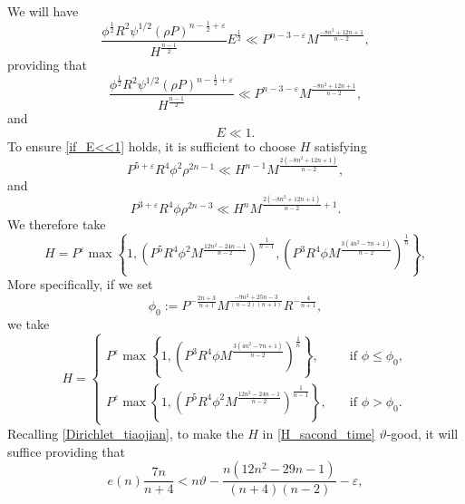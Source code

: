 \documentclass[12pt]{amsart}
\theoremstyle{definition}
\numberwithin{equation}{section}
\begin{document}
We will have
\begin{equation*}
    \frac{\phi^{\frac{1}{2}}R^2\psi^{1/2}(\rho P)^{n-\frac{1}{2}+\varepsilon}}{H^{\frac{n-1}{2}}}E^{\frac{1}{2}} \ll P^{n-3-\varepsilon}M^{\frac{-8n^2+12n+1}{n-2}},
\end{equation*}
providing that
\begin{equation}
    \label{if_E<<1}
    \frac{\phi^{\frac{1}{2}}R^2\psi^{1/2}(\rho P)^{n-\frac{1}{2}+\varepsilon}}{H^{\frac{n-1}{2}}} \ll P^{n-3-\varepsilon}M^{\frac{-8n^2+12n+1}{n-2}},
\end{equation}
and
\begin{equation}
    E \ll 1.
\end{equation}
To ensure \eqref{if_E<<1} holds, it is sufficient to choose $H$
satisfying
\begin{equation*}
    P^{5+\varepsilon}R^4\phi^2\rho^{2n-1} \ll H^{n-1}M^{\frac{2(-8n^2+12n+1)}{n-2}},
\end{equation*}
and
\begin{equation*}
    P^{3+\varepsilon}R^4\phi\rho^{2n-3} \ll H^{n}M^{\frac{2(-8n^2+12n+1)}{n-2}+1}.
\end{equation*}
We therefore take
\begin{equation*}
    H=P^{\varepsilon}\max\left\{ 1, (P^5R^4\phi^2M^{\frac{12n^2-24n-1}{n-2}})^{\frac{1}{n-1}}, (P^3R^4\phi M^{\frac{3(4n^2-7n+1)}{n-2}})^{\frac{1}{n}}\right\},
\end{equation*}
More specifically, if we set
\begin{equation*}
    \phi_0 := P^{-\frac{2n+3}{n+1}}M^{\frac{-9n^2+25n-3}{(n-2)(n+1)}}R^{-\frac{4}{n+1}},
\end{equation*}
we take
\begin{equation}
    \label{H_sacond_time}
    H=
    \begin{cases}
        P^{\varepsilon}\max\left\{ 1, (P^3R^4\phi M^{\frac{3(4n^2-7n+1)}{n-2}})^{\frac{1}{n}}\right\},\quad &\text{if }\phi \leq \phi_0,\\
        P^{\varepsilon}\max\left\{ 1, (P^5R^4\phi^2M^{\frac{12n^2-24n-1}{n-2}})^{\frac{1}{n-1}}\right\},\quad &\text{if }\phi > \phi_0.
    \end{cases}
\end{equation}
Recalling \eqref{Dirichlet_tiaojian}, 
to make the $H$ in \eqref{H_sacond_time} $\vartheta$-good, it will suffice providing that
\begin{equation*}
    e(n)\frac{7n}{n+4}< n\vartheta-\frac{n(12n^2-29n-1)}{(n+4)(n-2)}-\varepsilon,
\end{equation*}
\end{document}
